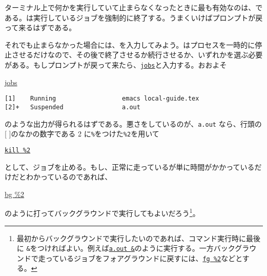 ターミナル上で何かを実行していて止まらなくなったときに最も有効なのは、である。は実行しているジョブを強制的に終了する。うまくいけばプロンプトが戻って来るはずである。

それでも止まらなかった場合には、を入力してみよう。はプロセスを一時的に停止させるだけなので、その後で終了させるか続行させるか、いずれかを選ぶ必要がある。もしプロンプトが戻って来たら、\underline{\tt jobs}と入力する。おおよそ
\begin{commandline2}
\prompt \underline{jobs}
\vspace*{-.8em} 
\begin{verbatim}
[1]    Running                  emacs local-guide.tex
[2]+   Suspended                a.out
\end{verbatim}
\end{commandline2} \noindent
のような出力が得られるはずである。悪さをしているのが、{\tt a.out} なら、行頭の[ ]のなかの数字である 2 に{\tt \%}をつけた{\tt \%2}を用いて
\begin{commandline2}
\prompt \underline{\tt kill \%2}
\end{commandline2} \noindent
として、ジョブを止める。もし、正常に走っているが単に時間がかかっているだけだとわかっているのであれば、
\begin{commandline2}
\prompt \underline{bg \%2}
\end{commandline2} \noindent
のように打ってバックグラウンドで実行してもよいだろう\footnote{最初からバックグラウンドで実行したいのであれば、コマンド実行時に最後に {\tt \&}をつければよい。例えば\underline{\tt a.out \&}のように実行する。一方バックグラウンドで走っているジョブをフォアグラウンドに戻すには、\underline{\tt fg \%2}などとする。}。

